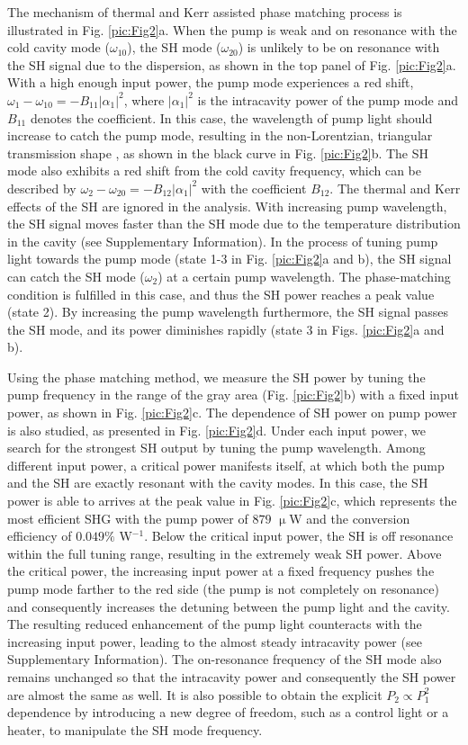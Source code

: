 \documentclass[a4paper,8pt,hyperref, twocolumn]{article}
\begin{document}
The mechanism of thermal and Kerr assisted phase matching process is illustrated in Fig. \ref{pic:Fig2}a. 
When the pump is weak and on resonance with the cold cavity mode ($\omega_{10}$), the SH mode ($\omega_{20}$) is unlikely to be on resonance with the SH signal due to the dispersion, as shown in the top panel of Fig. \ref{pic:Fig2}a. 
With a high enough input power, the pump mode experiences a red shift, $\omega_1-\omega_{10} = -B_{11}|\alpha_1|^2$, where $|\alpha_1|^2$ is the intracavity power of the pump mode and $B_{11}$ denotes the coefficient. 
In this case, the wavelength of pump light should increase to catch the pump mode, resulting in the non-Lorentzian, triangular transmission shape \cite{carmon2004dynamical}, as shown in the black curve in Fig. \ref{pic:Fig2}b.
The SH mode also exhibits a red shift from the cold cavity frequency, which can be described by $\omega_2-\omega_{20} = -B_{12}|\alpha_1|^2$ with the coefficient $B_{12}$. 
The thermal and Kerr effects of the SH are ignored in the analysis.
With increasing pump wavelength, the SH signal moves faster than the SH mode due to the temperature distribution in the cavity (see Supplementary Information).
In the process of tuning pump light towards the pump mode (state 1-3 in Fig. \ref{pic:Fig2}a and b), the SH signal can catch the SH mode ($\omega_2$) at a certain pump wavelength. 
The phase-matching condition is fulfilled in this case, and thus the SH power reaches a peak value (state 2).
By increasing the pump wavelength furthermore, the SH signal passes the SH mode, and its power diminishes rapidly (state 3 in Figs. \ref{pic:Fig2}a and b). 


Using the phase matching method, we measure the SH power by tuning the pump frequency in the range of the gray area (Fig. \ref{pic:Fig2}b) with a fixed input power, as shown in Fig. \ref{pic:Fig2}c. 
The dependence of SH power on pump power is also studied, as presented in Fig. \ref{pic:Fig2}d. 
Under each input power, we search for the strongest SH output by tuning the pump wavelength. 
Among different input power, a critical power manifests itself, at which both the pump and the SH are exactly resonant with the cavity modes. 
In this case, the SH power is able to arrives at the peak value in Fig. \ref{pic:Fig2}c, which represents the most efficient SHG with the pump power of $879$ $\upmu$W and the conversion efficiency of $0.049\%$ W$^{-1}$.
Below the critical input power, the SH is off resonance within the full tuning range, resulting in the extremely weak SH power.
Above the critical power, the increasing input power at a fixed frequency pushes the pump mode farther to the red side (the pump is not completely on resonance) and consequently increases the detuning between the pump light and the cavity.
The resulting reduced enhancement of the pump light counteracts with the increasing input power, leading to the almost steady intracavity power (see Supplementary Information). 
The on-resonance frequency of the SH mode also remains unchanged so that the intracavity power and consequently the SH power are almost the same as well.
It is also possible to obtain the explicit $P_2 \propto P_1^2$ dependence by introducing a new degree of freedom, such as a control light or a heater, to manipulate the SH mode frequency. 
\end{document}
